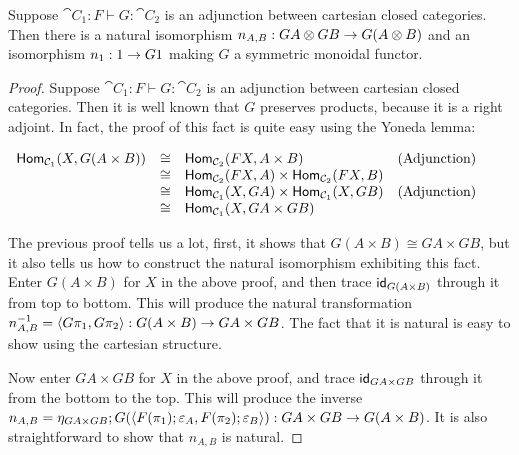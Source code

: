 \begin{lemma}
  \label{lemma:right-adjoints_are_strong_symmetric_monoidal_functors}
  Suppose $\cat{C}_1 : F \vdash G : \cat{C}_2$ is an adjunction
  between cartesian closed categories.  Then there is a natural
  isomorphism $n_{A,B} : GA \otimes GB \rightarrow G(A \otimes B)$ and an
  isomorphism $n_1 : 1 \rightarrow G1$ making $G$ a symmetric monoidal
  functor.  
\end{lemma}
\begin{proof}
  Suppose $\cat{C}_1 : F \vdash G : \cat{C}_2$ is an adjunction
  between cartesian closed categories.  Then it is well known that $G$
  preserves products, because it is a right adjoint.  In fact, the
  proof of this fact is quite easy using the Yoneda lemma:
  \begin{center}
    \begin{math}
      \begin{array}{lllllll}
        \mathsf{Hom}_{\mathcal{C}_1}(X,G(A \times B))
        & \cong & \mathsf{Hom}_{\mathcal{C}_2}(FX,A \times B) & \text{(Adjunction)}\\
        & \cong & \mathsf{Hom}_{\mathcal{C}_2}(FX,A) \times \mathsf{Hom}_{\mathcal{C}_2}(FX,B) & \\
        & \cong & \mathsf{Hom}_{\mathcal{C}_1}(X,GA) \times \mathsf{Hom}_{\mathcal{C}_1}(X,GB) & \text{(Adjunction)}\\
        & \cong & \mathsf{Hom}_{\mathcal{C}_1}(X,GA \times GB) 
      \end{array}
    \end{math}
  \end{center}
  The previous proof tells us a lot, first, it shows that $G(A \times
  B) \cong GA \times GB$, but it also tells us how to construct the
  natural isomorphism exhibiting this fact.  Enter $G(A \times B)$ for
  $X$ in the above proof, and then trace $\mathsf{id}_{G(A \times B)}$ through
  it from top to bottom.  This will produce the natural transformation
  $n^{-1}_{A,B} = \langle G\pi_1, G\pi_2\rangle : G(A \times B) \rightarrow GA
  \times GB$.  The fact that it is natural is easy to show using the
  cartesian structure.

  Now enter $GA \times GB$ for $X$ in the above proof, and trace
  $\mathsf{id}_{GA \times GB}$ through it from the bottom to the top.  This
  will produce the inverse \\
  $n_{A,B} = \eta_{GA \times GB};G(\langle F(\pi_1);\varepsilon_{A}, F(\pi_2);\varepsilon_{B} \rangle) : GA \times GB \rightarrow G(A \times B)$.
  It is also straightforward to show that $n_{A,B}$ is natural.


\end{proof}

